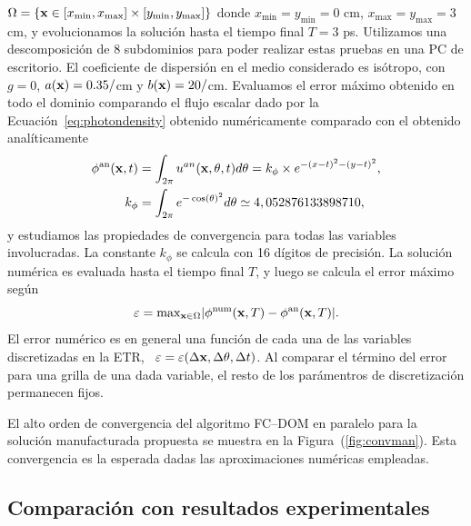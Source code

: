 $\Omega=\{ \mathbf{x} \in [x_{\text{min}},x_{\text{max}}]\times [y_{\text{min}},y_{\text{max}}] \}$
donde $x_{\text{min}}=y_{\text{min}}=0$ cm, $x_{\text{max}}=y_{\text{max}}=3$ cm, 
y evolucionamos la solución hasta el tiempo final $T=3$ ps. Utilizamos 
una descomposición de 8 subdominios para 
poder realizar estas pruebas en una PC de escritorio. 
El coeficiente de dispersión en el medio considerado es isótropo, 
con $g=0$, $a(\mathbf{x})=0.35/$cm y $b(\mathbf{x})=20/$cm. 
Evaluamos el error máximo obtenido en todo el dominio 
comparando el flujo escalar dado por la Ecuación~\eqref{eq:photondensity} 
obtenido numéricamente comparado con el obtenido analíticamente
\begin{equation*}
\begin{split}
\begin{aligned}
\phi^{\text{an}}(\mathbf{x},t)&=\int_{2\pi} u^{an}(\mathbf{x},\theta,t) d\theta=
k_{\phi}\times e^{-(x-t)^2-(y-t)^2},\\
k_{\phi}&=\int_{2\pi}e^{-\cos(\theta)^2}d\theta\simeq 4,052876133898710,
\end{aligned}
\end{split}
\label{eq:photondensityan}
\end{equation*}
y estudiamos las propiedades de convergencia 
para todas las variables involucradas. La constante 
$k_{\phi}$ se calcula con 16 dígitos de precisión. 
La solución numérica es evaluada hasta el tiempo final $T$, 
y luego se calcula el error máximo según
\begin{equation*}
\varepsilon=\text{max}_{\mathbf{x} \in \Omega} |\phi^{\text{num}}(\mathbf{x},T) -\phi^{\text{an}}(\mathbf{x},T)|.
\label{eq:maximumerror}
\end{equation*}
El error numérico es en general una función 
de cada una de las variables discretizadas en la ETR, 
\ie~$\varepsilon=\varepsilon(\Delta \mathbf{x}, \Delta \theta, \Delta t)$. 
Al comparar el término del error para una grilla de una dada variable, 
el resto de los parámentros de discretización permanecen fijos.

El alto orden de convergencia del algoritmo FC--DOM en paralelo 
para la solución manufacturada propuesta se muestra en la Figura~(\ref{fig:convman}). 
Esta convergencia es la esperada dadas las aproximaciones 
numéricas empleadas.
\subsection{Comparación con resultados experimentales}
\label{sec:resexp}

